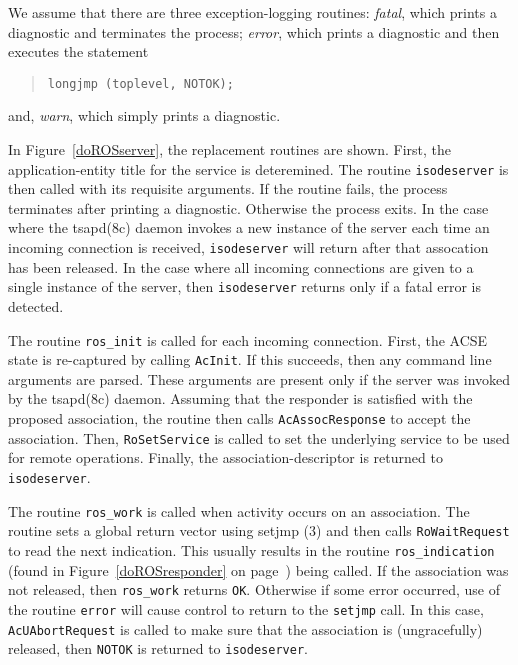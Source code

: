 We assume that there are three exception-logging routines:
{\em fatal}, which prints a diagnostic and terminates the process;
{\em error}, which prints a diagnostic and then executes the statement
\begin{quote}\small\begin{verbatim}
longjmp (toplevel, NOTOK);
\end{verbatim}\end{quote}
and,
{\em warn}, which simply prints a diagnostic.

In Figure~\ref{doROSserver},
the replacement routines are shown.
First, the application-entity title for the service is deteremined.
The routine \verb"isodeserver" is then called with its requisite arguments.
If the routine fails, the process terminates after printing a diagnostic.
Otherwise the process exits.
In the case where the \man tsapd(8c) daemon invokes a new instance of
the server each time an incoming connection is received,
\verb"isodeserver" will return after that assocation has been released.
In the case where all incoming connections are given to a single
instance of the server,
then \verb"isodeserver" returns only if a fatal error is detected.

The routine \verb"ros_init" is called for each incoming connection.
First, the ACSE state is re-captured by calling \verb"AcInit".
If this succeeds,
then any command line arguments are parsed.
These arguments are present only if the server was invoked by
the \man tsapd(8c) daemon.
Assuming that the responder is satisfied with the proposed association,
the routine then calls \verb"AcAssocResponse" to accept the association.
Then,
\verb"RoSetService" is called
to set the underlying service to be used for remote operations.
Finally,
the association-descriptor is returned to \verb"isodeserver".

The routine \verb"ros_work" is called when activity occurs on an association.
The routine sets a global return vector using \man setjmp (3)
and then calls \verb"RoWaitRequest" to read the next indication.
This usually results in the routine \verb"ros_indication"
(found in Figure~\ref{doROSresponder} on page~\pageref{doROSresponder})
being called.
If the association was not released,
then \verb"ros_work" returns \verb"OK".
Otherwise if some error occurred,
use of the routine \verb"error" will cause control to return to the
\verb"setjmp" call.
In this case,
\verb"AcUAbortRequest" is called to make sure that the association is
(ungracefully) released,
then \verb"NOTOK" is returned to \verb"isodeserver".

